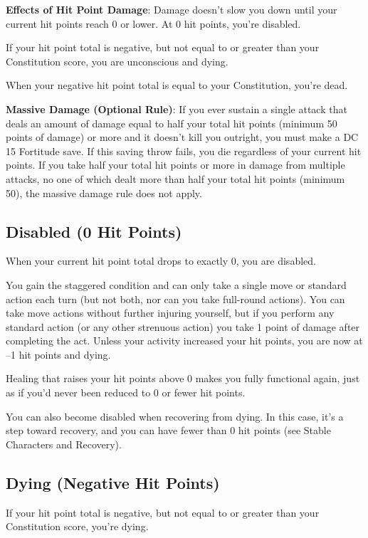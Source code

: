 \textbf{Effects of Hit Point Damage}: Damage doesn't slow you down until your current hit points reach 0 or lower. At 0 hit points, you're disabled.
				
If your hit point total is negative, but not equal to or greater than your Constitution score, you are unconscious and dying.
				
When your negative hit point total is equal to your Constitution, you're dead.
				
\textbf{Massive Damage (Optional Rule)}: If you ever sustain a single attack that deals an amount of damage equal to half your total hit points (minimum 50 points of damage) or more and it doesn't kill you outright, you must make a DC 15 Fortitude save. If this saving throw fails, you die regardless of your current hit points. If you take half your total hit points or more in damage from multiple attacks, no one of which dealt more than half your total hit points (minimum 50), the massive damage rule does not apply.
				
\subsection{Disabled (0 Hit Points)}

				
When your current hit point total drops to exactly 0, you are disabled.
				
You gain the staggered condition and can only take a single move or standard action each turn (but not both, nor can you take full-round actions). You can take move actions without further injuring yourself, but if you perform any standard action (or any other strenuous action) you take 1 point of damage after completing the act. Unless your activity increased your hit points, you are now at --1 hit points and dying.
				
Healing that raises your hit points above 0 makes you fully functional again, just as if you'd never been reduced to 0 or fewer hit points.
				
You can also become disabled when recovering from dying. In this case, it's a step toward recovery, and you can have fewer than 0 hit points (see Stable Characters and Recovery).
				
\subsection{Dying (Negative Hit Points)}

				
If your hit point total is negative, but not equal to or greater than your Constitution score, you're dying.
				
